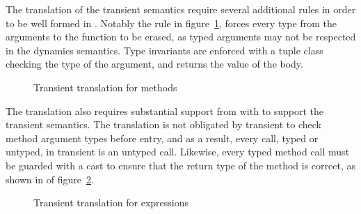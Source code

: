 \documentclass[a4paper,USenglish]{tex/lipics-v2016}
\begin{document}
The translation of the transient semantics require several additional rules in
order to be well formed in \kafka.  Notably the rule  in figure~\ref{fig:tratrans_cla}, 
forces every type from the arguments to the function to be erased,  
as typed arguments may not be respected in the dynamics semantics. Type invariants are enforced
with a tuple class checking the type of the argument, and returns the value of the body. 

\begin{figure}
\begin{mathpar}

\end{mathpar}
\caption{Transient translation for methods}
\label{fig:tratrans_cla}
\end{figure}

The translation also requires substantial support from 
with \kafka to support the transient semantics. The translation is not
obligated by transient to check method argument types before entry, and as a
result, every call,  typed or untyped, in transient is an untyped call.
Likewise, every typed method call must be guarded with a cast to ensure that
the return type of the method is correct, as shown in  of figure~\ref{fig:tratrans_exp}.
 
\begin{figure}
\begin{mathpar}





\end{mathpar}
\caption{Transient translation for expressions}
\label{fig:tratrans_exp}
\end{figure}
\end{document}
